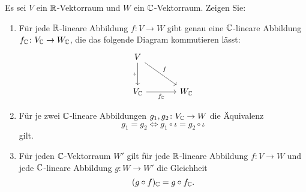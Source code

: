 \documentclass[a4paper,10pt]{scrartcl}
\begin{document}


\begin{question}
  Es sei $V$ ein $\mathbb{R}$-Vektorraum und $W$ ein $\mathbb{C}$-Vektorraum.
  Zeigen Sie:
  \begin{enumerate}[leftmargin=*]
    \item
      Für jede $\mathbb{R}$-lineare Abbildung $f \colon V \to W$ gibt genau eine $\mathbb{C}$-lineare Abbildung $f_{\mathbb{C}} \colon V_{\mathbb{C}} \to W_{\mathbb{C}}$, die das folgende Diagram kommutieren lässt:
      \[
        \begin{tikzcd}[row sep = large, column sep = large, ampersand replacement=\&]
                V       \arrow{d}[swap]{\iota}
                        \arrow{rd}{f}
            \&  {}
          \\
                V_\Cbb  \arrow{r}[swap]{f_\Cbb}
            \&  W_\Cbb
        \end{tikzcd}
      \]
    \item
      Für je zwei $\mathbb{C}$-lineare Abbildungen $g_1, g_2 \colon V_{\mathbb{C}} \to W$ die Äquivalenz
      \[
        g_1 = g_2
        \iff
        g_1 \circ \iota = g_2 \circ \iota
      \]
      gilt.
    \item
      Für jeden $\mathbb{C}$-Vektorraum $W'$ gilt für jede $\mathbb{R}$-lineare Abbildung $f \colon V \to W$ und jede $\mathbb{C}$-lineare Abbildung $g \colon W \to W'$ die Gleichheit
      \[
        (g \circ f)_{\mathbb{C}} = g \circ f_{\mathbb{C}}.
      \]
  \end{enumerate}
\end{question}
\end{document}

